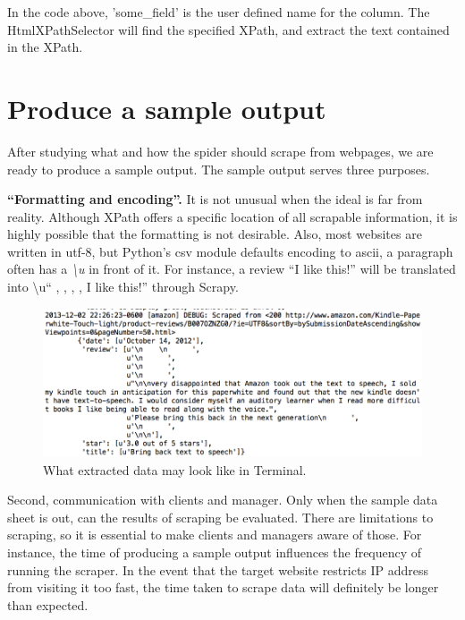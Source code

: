 \documentclass[12pt]{report}
\begin{document}
In the code above, 'some_field' is the user defined name for the column. The HtmlXPathSelector will find the specified XPath, and extract the text contained in the XPath.

\section{Produce a sample output}

After studying what and how the spider should scrape from webpages, we are ready to produce a sample output. The sample output serves three purposes.

\textbf{``Formatting and encoding''.} It is not unusual when the ideal is far from reality. Although XPath offers a specific location of all scrapable information, it is highly possible that the formatting is not desirable. Also, most websites are written in utf-8, but Python's csv module defaults encoding to ascii, a paragraph often has a \textit{\textbackslash u} in front of it. For instance, a review ``I like this!'' will be translated into \textbackslash u``   ,    ,    ,   , I like this!'' through Scrapy.
\begin{figure}[htp]
\includegraphics[width=\textwidth]{scrapy_screenshot_terminal.png}
\caption[Scrapy screenshot in Mac Terminal]
{What extracted data may look like in Terminal.}
\end{figure}

Second, communication with clients and manager. Only when the sample data sheet is out, can the results of scraping be evaluated. There are limitations to scraping, so it is essential to make clients and managers aware of those. For instance, the time of producing a sample output influences the frequency of running the scraper. In the event that the target website restricts IP address from visiting it too fast, the time taken to scrape data will definitely be longer than expected.
\end{document}
